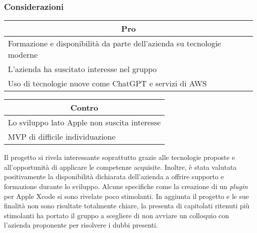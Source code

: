 \subsubsection{Considerazioni}
\begin{minipage}[t]{0.45\linewidth}
    \vspace{0pt}
    {\renewcommand{\arraystretch}{1.5}
    \begin{tabular}{p{1\linewidth}}
        \multicolumn{1}{c}{\textbf{Pro}} \\
        \midrule
        Formazione e disponibilità da parte dell'azienda su tecnologie moderne \\
        L'azienda ha suscitato interesse nel gruppo \\
        Uso di tecnologie nuove come ChatGPT e servizi di AWS \\
        \hline
    \end{tabular}
    }
\end{minipage}
\hspace{0.05\linewidth}
\begin{minipage}[t]{0.45\linewidth}
    \vspace{0pt}
    {\renewcommand{\arraystretch}{1.5}
    \begin{tabular}{p{1\linewidth}}
        \multicolumn{1}{c}{\textbf{Contro}} \\
        \midrule
        Lo sviluppo lato Apple non suscita interesse \\
        MVP di difficile individuazione     \\
        \hline
    \end{tabular}
    }
\end{minipage}
\vspace{1em} 

Il progetto si rivela interessante soprattutto grazie alle tecnologie proposte e all'opportunità di applicare le competenze acquisite. 
Inoltre, è stata valutata positivamente la disponibilità dichiarata dell'azienda a offrire supporto e formazione durante lo sviluppo.
Alcune specifiche come la creazione di un \textit{plugin} per Apple Xcode si sono rivelate poco stimolanti. 
In aggiunta il progetto e le sue finalità non sono risultate totalmente chiare, la presenta di capitolati ritenuti più stimolanti ha portato il gruppo a scegliere di non avviare un colloquio con l'azienda proponente per risolvere i dubbi presenti.
